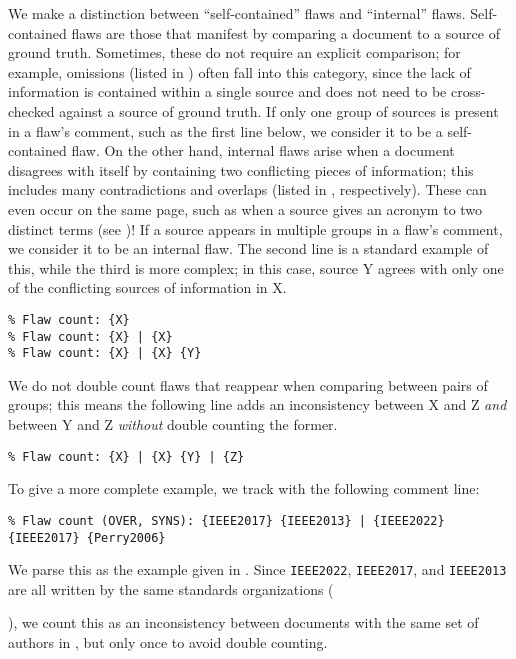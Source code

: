 We make a distinction between ``self-contained'' flaws and ``internal'' flaws.
Self-contained flaws are those that manifest by comparing a document to a
source of ground truth. Sometimes, these do not require an explicit comparison;
for example, omissions (listed in ) often fall into this category,
since the lack of information is contained within a single source and does not
need to be cross-checked against a source of ground truth. If only one group of
sources is present in a flaw's comment, such as the first line below, we
consider it to be a self-contained flaw. On the other hand, internal flaws
arise when a document disagrees with itself by containing two conflicting
pieces of information; this includes many contradictions and overlaps (listed
in , respectively). These can even occur on the same page,
such as when a source gives an acronym to two distinct terms
(see )! If a
source appears in multiple groups in a flaw's comment, we consider it to
be an internal flaw. The second line is a standard example of this, while the
third is more complex; in this case, source Y agrees with only one of the
conflicting sources of information in X.
\begin{displayquote}
    \texttt{\% Flaw count: \{X\}\\\% Flaw count: \{X\} | \{X\}\\
        \% Flaw count: \{X\} | \{X\} \{Y\}}
\end{displayquote}
We do not double count flaws that reappear when comparing between pairs of
groups; this means the following line adds an inconsistency between X and Z
\emph{and} between Y and Z \emph{without} double counting the former.
\begin{displayquote}
    \texttt{\% Flaw count: \{X\} | \{X\} \{Y\} | \{Z\}}
\end{displayquote}
To give a more complete example, we track  with the
following comment line:\utd{}
\begin{displayquote}
    \texttt{\% Flaw count (OVER, SYNS): \{IEEE2017\} \{IEEE2013\} | \{IEEE2022\}
        \displayNL{} \{IEEE2017\} \{Perry2006\}}
\end{displayquote}%
We parse this as the example given in . Since
\texttt{IEEE2022}, \texttt{IEEE2017}, and \texttt{IEEE2013} are all written by
the same standards
organizations (\begin{NoHyper}\citeauthor{IEEE2022}\end{NoHyper}), we count
this as an inconsistency between documents with the same set of authors in
, but only once to avoid double counting.

